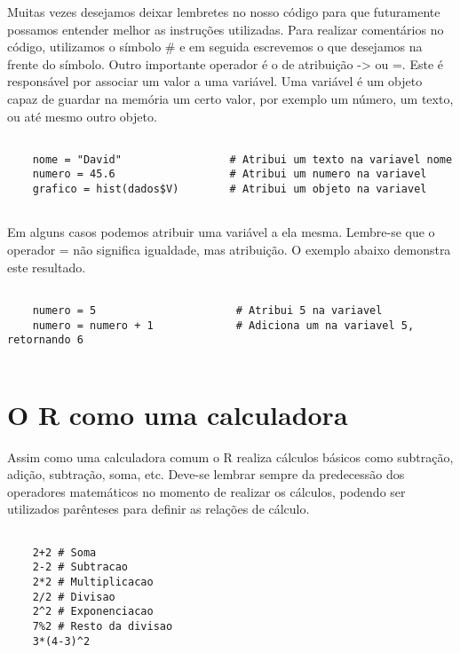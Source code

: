 Muitas vezes desejamos deixar lembretes no nosso código para que futuramente possamos entender melhor as instruções utilizadas. Para realizar comentários no código, utilizamos o símbolo \# e em seguida escrevemos o que desejamos na frente do símbolo.  Outro importante operador é o de atribuição -> ou =. Este é responsável por associar um valor a uma variável. Uma variável é um objeto capaz de guardar na memória um certo valor, por exemplo um número, um texto, ou até mesmo outro objeto. 

\begin{scriptsize}
	\estiloR
	\begin{lstlisting}[]
	
	nome = "David"                 # Atribui um texto na variavel nome
	numero = 45.6                  # Atribui um numero na variavel
	grafico = hist(dados$V)        # Atribui um objeto na variavel
	
	\end{lstlisting}
\end{scriptsize}
 
 Em alguns casos podemos atribuir uma variável a ela mesma. Lembre-se que o operador = não significa igualdade, mas atribuição. O exemplo abaixo demonstra este resultado. 
 
 \begin{scriptsize}
 	\estiloR
 	\begin{lstlisting}[]
 	
 	numero = 5 						# Atribui 5 na variavel 
 	numero = numero + 1				# Adiciona um na variavel 5, retornando 6
 	
 	\end{lstlisting}
 \end{scriptsize}

\section{O R como uma calculadora}

Assim como uma calculadora comum o R realiza cálculos básicos como subtração, adição, subtração, soma, etc. Deve-se lembrar sempre da predecessão dos operadores matemáticos no momento de realizar os cálculos, podendo ser utilizados parênteses para definir as relações de cálculo.  

\begin{scriptsize}
	\estiloR
	\begin{lstlisting}[]
		
	2+2 # Soma            
	2-2 # Subtracao      
	2*2 # Multiplicacao      
	2/2 # Divisao            
	2^2 # Exponenciacao  
	7%2 # Resto da divisao    
	3*(4-3)^2        
	         
	\end{lstlisting}
\end{scriptsize}

